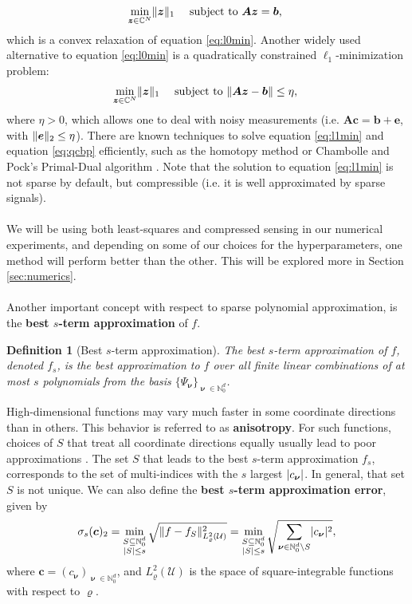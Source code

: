 \documentclass[12pt, oneside]{report}   	%
\newcommand{\C}{\mathbb{C}}
\newcommand{\N}{\mathbb{N}}
\newtheorem{defn}{Definition}
\DeclarePairedDelimiter{\abs}{\lvert}{\rvert}
\DeclarePairedDelimiter{\norm}{\lVert}{\rVert}        %
\DeclareMathOperator{\nuu}{\boldsymbol{\nu}}
\begin{document}
\begin{equation}
\label{eq:l1min}
\min_{\boldsymbol{z}\in\C^N} \norm{\boldsymbol{z}}_1 \quad \text { subject to } \boldsymbol{A z}=\boldsymbol{b} \text {, }
\end{equation}
which is a convex relaxation of equation \eqref{eq:l0min}. Another widely used alternative to equation \eqref{eq:l0min} is a quadratically constrained $\ell_1$-minimization problem: 
\begin{equation}
\label{eq:qcbp}
\min_{\boldsymbol{z}\in\C^N} \norm{\boldsymbol{z}}_1 \quad \text { subject to } \norm{\boldsymbol{A z}-\boldsymbol{b}}\leq\eta \text {, }
\end{equation}
where $\eta>0$, which allows one to deal with noisy measurements (i.e. $\boldsymbol{A c}=\boldsymbol{b}+\boldsymbol{e}$, with $\norm{\boldsymbol{e}}_2\leq\eta$). There are known techniques to solve equation \eqref{eq:l1min} and equation \eqref{eq:qcbp} efficiently, such as the homotopy method or Chambolle and Pock’s Primal-Dual algorithm \cite{foucart2013invitation}. Note that the solution to equation \eqref{eq:l1min} is not sparse by default, but compressible (i.e. it is well approximated by sparse signals).\\\\
We will be using both least-squares and compressed sensing in our numerical experiments, and depending on some of our choices for the hyperparameters, one method will perform better than the other. This will be explored more in Section \ref{sec:numerics}.\\\\
Another important concept with respect to sparse polynomial approximation, is the \textbf{best $s$-term approximation} of $f$.

\begin{defn}[Best $s$-term approximation]
The best $s$-term approximation of $f$, denoted $f_s$, is the best approximation to $f$ over all finite linear combinations of at most $s$ polynomials from the basis $\{\Psi_{\nuu}\}_{\nuu\in\N_0^d}$. 
\end{defn}
\smallskip

\noindent High-dimensional functions may vary much faster in some coordinate directions than in others. This behavior is referred to as \textbf{anisotropy}. For such functions, choices of $S$ that treat all coordinate directions equally usually lead to poor approximations \cite{sparsepoly}. The set $S$ that leads to the best $s$-term approximation $f_s$, corresponds to the set of multi-indices with the $s$ largest $\abs{c_{\nuu}}$. In general, that set $S$ is not unique. We can also define the \textbf{best $s$-term approximation error}, given by
$$
\sigma_s(\boldsymbol{c})_2 = \min_{\substack{S\subseteq\N_0^d \\ \abs{S}\leq s}} \sqrt{\norm{f-f_S}_{L_\varrho^2(\mathcal{U})}^2} = \min_{\substack{S\subseteq\N_0^d \\ \abs{S}\leq s}}\sqrt{\sum_{\nuu\in\N_0^d\backslash S} \abs{c_{\nuu}}^2},
$$
where $\boldsymbol{c}=(c_{\nuu})_{\nuu\in\N_0^d}$, and $L_\varrho^2(\mathcal{U})$ is the space of square-integrable functions with respect to $\varrho$.
\end{document}
